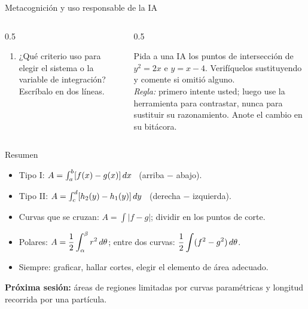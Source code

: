 \documentclass[10pt,aspectratio=169]{beamer}
\begin{document}
\begin{frame}{Metacognición y uso responsable de la IA}
  \small
  \begin{columns}[t]
    \begin{column}{0.5\textwidth}
      \begin{metacog}
        \begin{enumerate}
          \metacomun
          \item ¿Qué criterio uso para elegir el sistema o la variable de integración? Escríbalo en dos líneas.
        \end{enumerate}
      \end{metacog}
    \end{column}
    \begin{column}{0.5\textwidth}
      \begin{iabox}
        Pida a una IA los puntos de intersección de $y^2=2x$ e $y=x-4$. Verifíquelos sustituyendo y comente si omitió alguno.\\[2pt]
        \textit{Regla:} primero intente usted; luego use la herramienta para contrastar, nunca para sustituir su razonamiento. Anote el cambio en su bitácora.
      \end{iabox}
    \end{column}
  \end{columns}
\end{frame}

\begin{frame}{Resumen}
  \begin{itemize}
    \item Tipo I: $A=\int_a^b[f(x)-g(x)]\,dx$ \ (arriba $-$ abajo).
    \item Tipo II: $A=\int_c^d[h_2(y)-h_1(y)]\,dy$ \ (derecha $-$ izquierda).
    \item Curvas que se cruzan: $A=\int|f-g|$; dividir en los puntos de corte.
    \item Polares: $A=\dfrac12\displaystyle\int_\alpha^\beta r^2\,d\theta$; entre dos curvas: $\dfrac12\displaystyle\int(f^2-g^2)\,d\theta$.
    \item Siempre: graficar, hallar cortes, elegir el elemento de área adecuado.
  \end{itemize}
  \vspace{3mm}
  \textbf{Próxima sesión:} áreas de regiones limitadas por curvas paramétricas y longitud recorrida por una partícula.
\end{frame}
\end{document}
